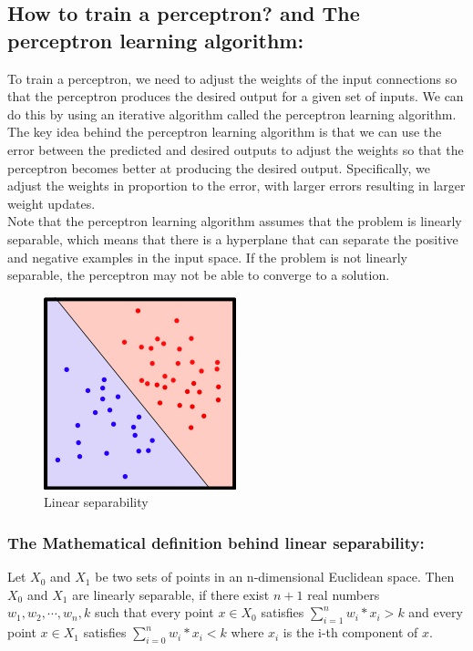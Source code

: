 \documentclass[12pt]{article}
\begin{document}
\subsection{How to train a perceptron? and The perceptron learning algorithm:}
To train a perceptron, we need to adjust the weights of the input connections so that the
perceptron produces the desired output for a given set of inputs. We can do this by using an
iterative algorithm called the perceptron learning algorithm.\\
The key idea behind the perceptron learning algorithm is that we can use the error between the
predicted and desired outputs to adjust the weights so that the perceptron becomes better at
producing the desired output. Specifically, we adjust the weights in proportion to the error, with
larger errors resulting in larger weight updates.\\
Note that the perceptron learning algorithm assumes that the problem is linearly separable, which
means that there is a hyperplane that can separate the positive and negative examples in the input
space. If the problem is not linearly separable, the perceptron may not be able to converge to a
solution.\\
\begin{figure}[h]
  \centering
  \includegraphics{linearly.png}
  \caption{Linear separability}
\end{figure}
\newpage
\subsubsection{The Mathematical definition behind linear separability:}
Let $X_0$ and $X_1$ be two sets of points in an n-dimensional Euclidean space. Then $X_0$ and $X_1$
are linearly separable, if there exist $n + 1$ real numbers $w_1, w_2, \cdots, w_n, k$ such that
every point $x \in X_0$ satisfies $\sum_{i = 1}^{n}w_i * x_i > k$ and every point $x \in X_1$ satisfies
$\sum_{i = 0}^{n}w_i * x_i < k$ where $x_i$ is the i-th component of $x$.
\end{document}
